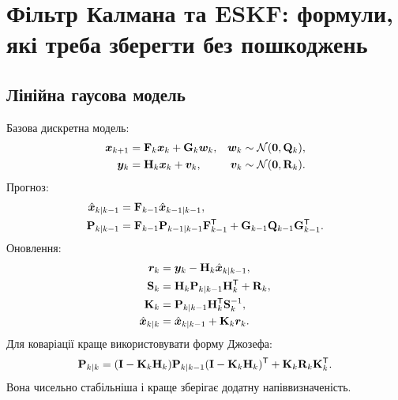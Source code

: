 \chapter{Фільтр Калмана та ESKF: формули, які треба зберегти без пошкоджень}


\section{Лінійна гаусова модель}

Базова дискретна модель:
\begin{subequations}\label{eq:linear_gaussian_model_session02}
\begin{align}
\bm{x}_{k+1}&=\mathbf{F}_k\bm{x}_k+\mathbf{G}_k\bm{w}_k,
&\bm{w}_k&\sim\mathcal{N}(\bm{0},\mathbf{Q}_k),\\
\bm{y}_k&=\mathbf{H}_k\bm{x}_k+\bm{v}_k,
&\bm{v}_k&\sim\mathcal{N}(\bm{0},\mathbf{R}_k).
\end{align}
\end{subequations}
Прогноз:
\begin{subequations}\label{eq:kf_predict_session02}
\begin{align}
\hat{\bm{x}}_{k|k-1}&=\mathbf{F}_{k-1}\hat{\bm{x}}_{k-1|k-1},\\
\mathbf{P}_{k|k-1}&=\mathbf{F}_{k-1}\mathbf{P}_{k-1|k-1}\mathbf{F}_{k-1}^{\mathsf{T}}
+\mathbf{G}_{k-1}\mathbf{Q}_{k-1}\mathbf{G}_{k-1}^{\mathsf{T}}.
\end{align}
\end{subequations}
Оновлення:
\begin{subequations}\label{eq:kf_update_session02}
\begin{align}
\bm{r}_k&=\bm{y}_k-\mathbf{H}_k\hat{\bm{x}}_{k|k-1},\\
\mathbf{S}_k&=\mathbf{H}_k\mathbf{P}_{k|k-1}\mathbf{H}_k^{\mathsf{T}}+\mathbf{R}_k,\\
\mathbf{K}_k&=\mathbf{P}_{k|k-1}\mathbf{H}_k^{\mathsf{T}}\mathbf{S}_k^{-1},\\
\hat{\bm{x}}_{k|k}&=\hat{\bm{x}}_{k|k-1}+\mathbf{K}_k\bm{r}_k.
\end{align}
\end{subequations}
Для коваріації краще використовувати форму Джозефа:
\begin{equation}\label{eq:joseph_session02}
\mathbf{P}_{k|k}=(\mathbf{I}-\mathbf{K}_k\mathbf{H}_k)\mathbf{P}_{k|k-1}(\mathbf{I}-\mathbf{K}_k\mathbf{H}_k)^{\mathsf{T}}
+\mathbf{K}_k\mathbf{R}_k\mathbf{K}_k^{\mathsf{T}}.
\end{equation}
Вона чисельно стабільніша і краще зберігає додатну напіввизначеність.

